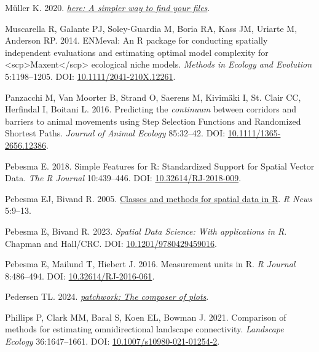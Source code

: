 \documentclass[10pt,a4paper]{article}
\newlength{\cslhangindent}
\newenvironment{CSLReferences}[2] %
 {\begin{list}{}{%
  \setlength{\itemindent}{0pt}
  \setlength{\leftmargin}{0pt}
  \setlength{\parsep}{0pt}
  \ifodd #1
   \setlength{\leftmargin}{\cslhangindent}
   \setlength{\itemindent}{-1\cslhangindent}
  \fi
  \setlength{\itemsep}{#2\baselineskip}}}
 {\end{list}}
\begin{document}
\begin{CSLReferences}{1}{0}
Müller K. 2020. \emph{\href{https://CRAN.R-project.org/package=here}{{here}: A simpler way to find your files}}.

Muscarella R, Galante PJ, Soley-Guardia M, Boria RA, Kass JM, Uriarte M, Anderson RP. 2014. {ENMeval}: {An} {R} package for conducting spatially independent evaluations and estimating optimal model complexity for {\textless{}}scp{\textgreater{}}{Maxent}{\textless{}}/scp{\textgreater{}} ecological niche models. \emph{Methods in Ecology and Evolution} 5:1198--1205. DOI: \href{https://doi.org/10.1111/2041-210X.12261}{10.1111/2041-210X.12261}.

Panzacchi M, Van Moorter B, Strand O, Saerens M, Kivimäki I, St. Clair CC, Herfindal I, Boitani L. 2016. Predicting the \emph{continuum} between corridors and barriers to animal movements using {Step} {Selection} {Functions} and {Randomized} {Shortest} {Paths}. \emph{Journal of Animal Ecology} 85:32--42. DOI: \href{https://doi.org/10.1111/1365-2656.12386}{10.1111/1365-2656.12386}.

Pebesma E. 2018. {Simple Features for R: Standardized Support for Spatial Vector Data}. \emph{{The R Journal}} 10:439--446. DOI: \href{https://doi.org/10.32614/RJ-2018-009}{10.32614/RJ-2018-009}.

Pebesma EJ, Bivand R. 2005. \href{https://CRAN.R-project.org/doc/Rnews/}{Classes and methods for spatial data in {R}}. \emph{R News} 5:9--13.

Pebesma E, Bivand R. 2023. \emph{{Spatial Data Science: With applications in R}}. {Chapman and Hall/CRC}. DOI: \href{https://doi.org/10.1201/9780429459016}{10.1201/9780429459016}.

Pebesma E, Mailund T, Hiebert J. 2016. Measurement units in {R}. \emph{R Journal} 8:486--494. DOI: \href{https://doi.org/10.32614/RJ-2016-061}{10.32614/RJ-2016-061}.

Pedersen TL. 2024. \emph{\href{https://CRAN.R-project.org/package=patchwork}{{patchwork}: The composer of plots}}.

Phillips P, Clark MM, Baral S, Koen EL, Bowman J. 2021. Comparison of methods for estimating omnidirectional landscape connectivity. \emph{Landscape Ecology} 36:1647--1661. DOI: \href{https://doi.org/10.1007/s10980-021-01254-2}{10.1007/s10980-021-01254-2}.


\end{CSLReferences}
\end{document}
